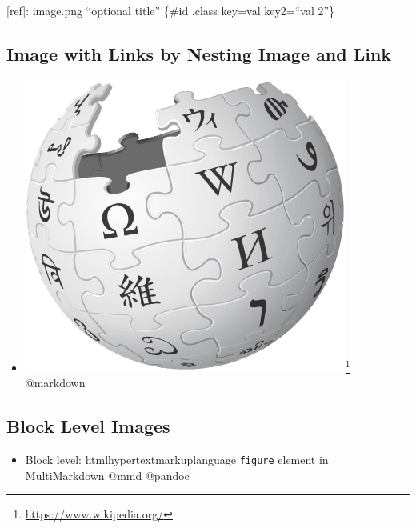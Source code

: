 [ref]: image.png ``optional title'' \{\#id .class key=val key2=``val 2''\}

\subsection{Image with Links by Nesting Image and Link}
\label{imagewithlinksbynestingimageandlink}

\begin{itemize}
\item \href{https://www.wikipedia.org/}{\includegraphics[keepaspectratio,width=\textwidth,height=0.75\textheight]{image.png}}\footnote{\href{https://www.wikipedia.org/}{https:/\slash www.wikipedia.org\slash }} @markdown

\end{itemize}

\subsection{Block Level Images}
\label{blocklevelimages}

\begin{itemize}
\item Block level: \ac{htmlhypertextmarkuplanguage} \texttt{figure} element in MultiMarkdown @mmd @pandoc

\end{itemize}

